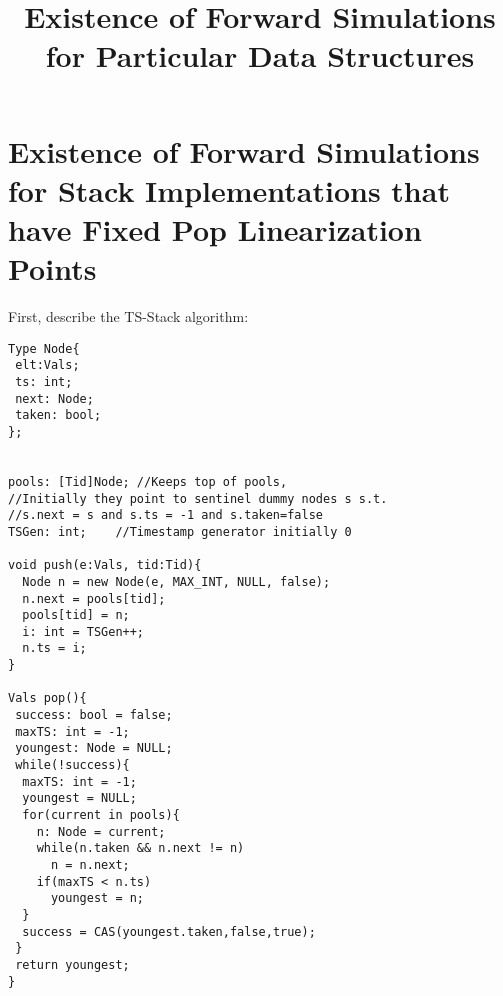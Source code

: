 \documentclass{article}
\title{Existence of Forward Simulations for Particular Data Structures}
\begin{document}
\maketitle



\section{Existence of Forward Simulations for Stack Implementations that have Fixed Pop Linearization Points}

First, describe the TS-Stack algorithm:

\begin{lstlisting}
Type Node{
 elt:Vals;
 ts: int;
 next: Node;
 taken: bool;
};


pools: [Tid]Node; //Keeps top of pools, 
//Initially they point to sentinel dummy nodes s s.t.
//s.next = s and s.ts = -1 and s.taken=false
TSGen: int;    //Timestamp generator initially 0

void push(e:Vals, tid:Tid){
  Node n = new Node(e, MAX_INT, NULL, false);
  n.next = pools[tid];
  pools[tid] = n;
  i: int = TSGen++;
  n.ts = i;
}

Vals pop(){
 success: bool = false;
 maxTS: int = -1;
 youngest: Node = NULL;
 while(!success){
  maxTS: int = -1;
  youngest = NULL;
  for(current in pools){
    n: Node = current;
    while(n.taken && n.next != n)
      n = n.next;
    if(maxTS < n.ts)
      youngest = n;
  }
  success = CAS(youngest.taken,false,true);
 }
 return youngest;
}

\end{lstlisting}

\end{document}
